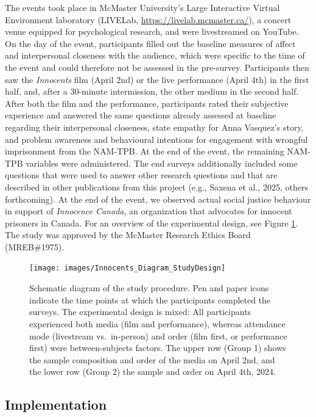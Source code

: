 \documentclass[
  man,floatsintext]{apa6}
\begin{document}
The events took place in McMaster University's Large Interactive Virtual Environment laboratory (LIVELab, \url{https://livelab.mcmaster.ca/}), a concert venue equipped for psychological research, and were livestreamed on YouTube. On the day of the event, participants filled out the baseline measures of affect and interpersonal closeness with the audience, which were specific to the time of the event and could therefore not be assessed in the pre-survey. Participants then saw the \textit{Innocents} film (April 2nd) or the live performance (April 4th) in the first half, and, after a 30-minute intermission, the other medium in the second half. After both the film and the performance, participants rated their subjective experience and answered the same questions already assessed at baseline regarding their interpersonal closeness, state empathy for Anna Vasquez's story, and problem awareness and behavioural intentions for engagement with wrongful imprisonment from the NAM-TPB. At the end of the event, the remaining NAM-TPB variables were administered. The end surveys additionally included some questions that were used to answer other research questions and that are described in other publications from this project (e.g., Saxena et al., 2025, others forthcoming). At the end of the event, we observed actual social justice behaviour in support of \textit{Innocence Canada}, an organization that advocates for innocent prisoners in Canada. For an overview of the experimental design, see Figure \ref{fig:study-design}. The study was approved by the McMaster Research Ethics Board (MREB\#1975).



\begin{figure}
\texttt{[image: images/Innocents\_Diagram\_StudyDesign]} \caption{Schematic diagram of the study procedure. Pen and paper icons indicate the time points at which the participants completed the surveys. The experimental design is mixed: All participants experienced both media (film and performance), whereas attendance mode (livestream vs.~in-person) and order (film first, or performance first) were between-subjects factors. The upper row (Group 1) shows the sample composition and order of the media on April 2nd, and the lower row (Group 2) the sample and order on April 4th, 2024.}\label{fig:study-design}
\end{figure}

\subsection{Implementation}\label{implementation}
\end{document}

